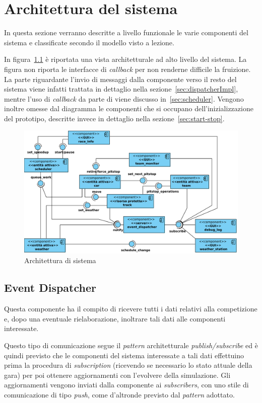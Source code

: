 \chapter{Architettura del sistema}
In questa sezione verranno descritte a livello funzionale le varie componenti del sistema e classificate secondo il modello visto a lezione.

In figura~\ref{fig:architettura} è riportata una vista architetturale ad alto livello del sistema. La figura non riporta le interfacce di \textit{callback} per non renderne difficile la fruizione. La parte riguardante l'invio di messaggi dalla componente \evdisp{} verso il resto del sistema viene infatti trattata in dettaglio nella sezione~\ref{sec:dispatcherImpl}, mentre l'uso di \textit{callback} da parte di \sched{} viene discusso in~\ref{sec:scheduler}. Vengono inoltre omesse dal diagramma le componenti che si occupano dell'inizializzazione del prototipo, descritte invece in dettaglio nella sezione~\ref{sec:start-stop}.

\begin{landscape}
\begin{figure}
\includegraphics[height=.43\paperheight]{diagrammi/Arch}
\caption{Architettura di sistema}
\label{fig:architettura}
\end{figure}
\end{landscape}

\section{Event Dispatcher}
\label{sec:dispatcherArch}
Questa componente ha il compito di ricevere tutti i dati relativi alla competizione e, dopo una eventuale rielaborazione, inoltrare tali dati alle componenti interessate.

Questo tipo di comunicazione segue il \textit{pattern} architetturale \textit{publish/subscribe} ed è quindi previsto che le componenti del sistema interessate a tali dati effettuino prima la procedura di \textit{subscription} (ricevendo se necessario lo stato attuale della gara) per poi ottenere aggiornamenti con l'evolvere della simulazione. Gli aggiornamenti vengono inviati dalla componente \evdisp{} ai \textit{subscribers}, con uno stile di comunicazione di tipo \textit{push}, come d'altronde previsto dal \textit{pattern} adottato.


